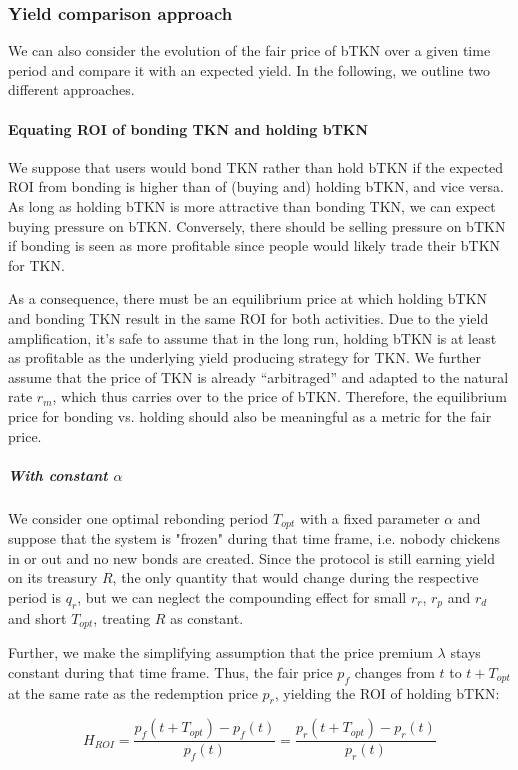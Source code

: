 \documentclass{article}
\begin{document}
\subsubsection{Yield comparison approach}
We can also consider the evolution of the fair price of bTKN over a given time period and compare it with an expected yield. In the following, we outline two different approaches.

\paragraph{Equating ROI of bonding TKN and holding bTKN}
We suppose that users would bond TKN rather than hold bTKN if the expected ROI from bonding is higher than of (buying and) holding bTKN, and vice versa. As long as holding bTKN is more attractive than bonding TKN, we can expect buying pressure on bTKN. Conversely, there should be selling pressure on bTKN if bonding is seen as more profitable since people would likely trade their bTKN for TKN. 

As a consequence, there must be an equilibrium price at which holding bTKN and bonding TKN result in the same ROI for both activities. Due to the yield amplification, it's safe to assume that in the long run, holding bTKN is at least as profitable as the underlying yield producing strategy for TKN. We further assume that the price of TKN is already “arbitraged” and adapted to the natural rate $r_m$, which thus carries over to the price of bTKN. Therefore, the equilibrium price for bonding vs. holding should also be meaningful as a metric for the fair price.

\subparagraph{With constant $\alpha$}
We consider one optimal rebonding period $T_{opt}$ with a fixed parameter $\alpha$ and suppose that the system is "frozen" during that time frame, i.e. nobody chickens in or out and no new bonds are created. Since the protocol is still earning yield on its treasury $R$, the only quantity that would change during the respective period is $q_r$, but we can neglect the compounding effect for small $r_r$, $r_p$ and $r_d$ and short $T_{opt}$, treating $R$ as constant.

Further, we make the simplifying assumption that the price premium $\lambda$ stays constant during that time frame. Thus, the fair price $p_f$ changes from $t$ to $t+T_{opt}$ at the same rate as the redemption price $p_r$, yielding the ROI of holding bTKN:

\begin{equation}
  \label{eq:ROI-eq}
  H_{ROI} = \frac{p_f(t + T_{opt}) - p_f(t)}{p_f(t)} = \frac{p_r(t + T_{opt}) - p_r(t)}{p_r(t)}
\end{equation}
\end{document}
